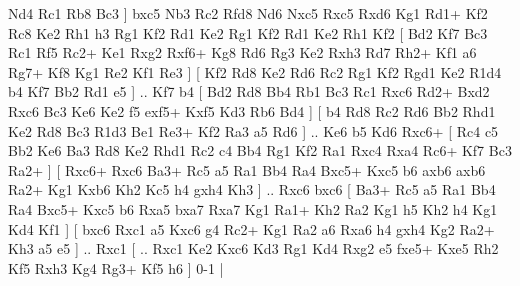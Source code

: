Nd4  Rc1 Rb8  Bc3   ]  bxc5   Nb3    Rc2   Rfd8    Nd6   Nxc5    Rxc5   Rxd6    Kg1   Rd1+    Kf2  Rc8    Ke2   Rh1    h3   Rg1    Kf2   Rd1    Ke2   Rg1    Kf2   Rd1    Ke2   Rh1    Kf2 [  Bd2 Kf7  Bc3 Rc1  Rf5 Rc2+  Ke1 Rxg2  Rxf6+ Kg8  Rd6 Rg3  Ke2 Rxh3  Rd7 Rh2+  Kf1 a6  Rg7+ Kf8  Kg1 Re2  Kf1 Re3   ]  [  Kf2 Rd8  Ke2 Rd6  Rc2 Rg1  Kf2 Rgd1  Ke2 R1d4  b4 Kf7  Bb2 Rd1  e5   ] .. Kf7    b4 [  Bd2 Rd8  Bb4 Rb1  Bc3 Rc1  Rxc6 Rd2+  Bxd2 Rxc6  Bc3 Ke6  Ke2 f5  exf5+ Kxf5  Kd3 Rb6  Bd4   ]  [  b4 Rd8  Rc2 Rd6  Bb2 Rhd1  Ke2 Rd8  Bc3 R1d3  Be1 Re3+  Kf2 Ra3  a5 Rd6   ] .. Ke6    b5   Kd6    Rxc6+ [  Rc4 c5  Bb2 Ke6  Ba3 Rd8  Ke2 Rhd1  Rc2 c4  Bb4 Rg1  Kf2 Ra1  Rxc4 Rxa4  Rc6+ Kf7  Bc3 Ra2+   ]  [  Rxc6+ Rxc6  Ba3+ Rc5  a5 Ra1  Bb4 Ra4  Bxc5+ Kxc5  b6 axb6  axb6 Ra2+  Kg1 Kxb6  Kh2 Kc5  h4 gxh4  Kh3   ] .. Rxc6    bxc6 [  Ba3+ Rc5  a5 Ra1  Bb4 Ra4  Bxc5+ Kxc5  b6 Rxa5  bxa7 Rxa7  Kg1 Ra1+  Kh2 Ra2  Kg1 h5  Kh2 h4  Kg1 Kd4  Kf1   ]  [  bxc6 Rxc1  a5 Kxc6  g4 Rc2+  Kg1 Ra2  a6 Rxa6  h4 gxh4  Kg2 Ra2+  Kh3 a5  e5   ] .. Rxc1    [ .. Rxc1  Ke2 Kxc6  Kd3 Rg1  Kd4 Rxg2  e5 fxe5+  Kxe5 Rh2  Kf5 Rxh3  Kg4 Rg3+  Kf5 h6   ] 0-1  |
